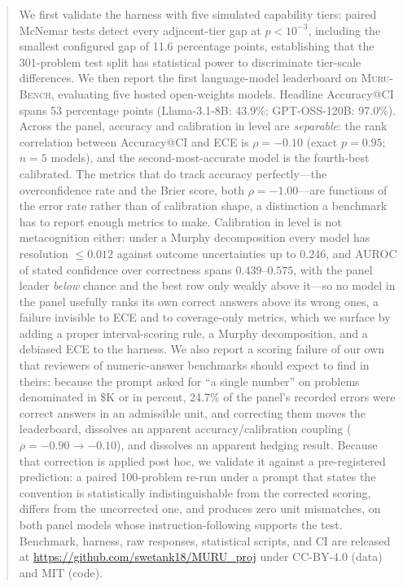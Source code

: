 \documentclass{article}
\newcommand{\muru}{\textsc{Muru-Bench}}
\begin{document}
\begin{abstract}
We first validate the harness with five simulated capability tiers: paired McNemar tests detect every adjacent-tier gap at $p < 10^{-3}$, including the smallest configured gap of 11.6 percentage points, establishing that the 301-problem test split has statistical power to discriminate tier-scale differences. We then report the first language-model leaderboard on \muru{}, evaluating five hosted open-weights models. Headline Accuracy@CI spans 53 percentage points (Llama-3.1-8B: 43.9\%; GPT-OSS-120B: 97.0\%). Across the panel, accuracy and calibration in level are \emph{separable}: the rank correlation between Accuracy@CI and ECE is $\rho = -0.10$ (exact $p = 0.95$; $n = 5$ models), and the second-most-accurate model is the fourth-best calibrated. The metrics that do track accuracy perfectly---the overconfidence rate and the Brier score, both $\rho = -1.00$---are functions of the error rate rather than of calibration shape, a distinction a benchmark has to report enough metrics to make. Calibration in level is not metacognition either: under a Murphy decomposition every model has resolution $\leq 0.012$ against outcome uncertainties up to $0.246$, and AUROC of stated confidence over correctness spans $0.439$--$0.575$, with the panel leader \emph{below} chance and the best row only weakly above it---so no model in the panel usefully ranks its own correct answers above its wrong ones, a failure invisible to ECE and to coverage-only metrics, which we surface by adding a proper interval-scoring rule, a Murphy decomposition, and a debiased ECE to the harness. We also report a scoring failure of our own that reviewers of numeric-answer benchmarks should expect to find in theirs: because the prompt asked for ``a single number'' on problems denominated in \$K or in percent, 24.7\% of the panel's recorded errors were correct answers in an admissible unit, and correcting them moves the leaderboard, dissolves an apparent accuracy/calibration coupling ($\rho = -0.90 \to -0.10$), and dissolves an apparent hedging result. Because that correction is applied post hoc, we validate it against a pre-registered prediction: a paired 100-problem re-run under a prompt that states the convention is statistically indistinguishable from the corrected scoring, differs from the uncorrected one, and produces zero unit mismatches, on both panel models whose instruction-following supports the test. Benchmark, harness, raw responses, statistical scripts, and CI are released at \url{https://github.com/swetank18/MURU_proj} under CC-BY-4.0 (data) and MIT (code).
\end{abstract}
\end{document}

